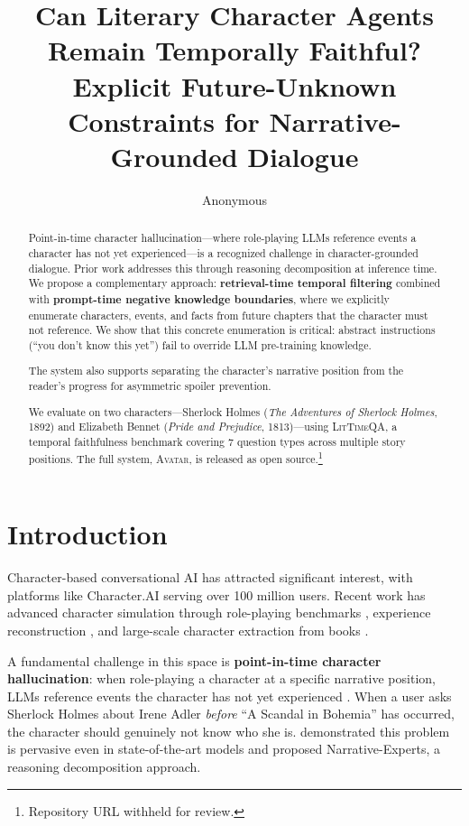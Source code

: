 \documentclass[11pt,a4paper]{article}
\title{Can Literary Character Agents Remain Temporally Faithful?\\Explicit Future-Unknown Constraints for Narrative-Grounded Dialogue}
\author{Anonymous}
\date{}
\begin{document}
\maketitle

\begin{abstract}
Point-in-time character hallucination---where role-playing LLMs reference events a character has not yet experienced---is a recognized challenge in character-grounded dialogue.
Prior work addresses this through reasoning decomposition at inference time.
We propose a complementary approach: \textbf{retrieval-time temporal filtering} combined with \textbf{prompt-time negative knowledge boundaries}, where we explicitly enumerate characters, events, and facts from future chapters that the character must not reference.
We show that this concrete enumeration is critical: abstract instructions (``you don't know this yet'') fail to override LLM pre-training knowledge.

The system also supports separating the character's narrative position from the reader's progress for asymmetric spoiler prevention.

We evaluate on two characters---Sherlock Holmes (\textit{The Adventures of Sherlock Holmes}, 1892) and Elizabeth Bennet (\textit{Pride and Prejudice}, 1813)---using \textsc{LitTimeQA}, a temporal faithfulness benchmark covering 7 question types across multiple story positions.
The full system, \textsc{Avatar}, is released as open source.\footnote{Repository URL withheld for review.}
\end{abstract}

\section{Introduction}
\label{sec:intro}

Character-based conversational AI has attracted significant interest, with platforms like Character.AI serving over 100 million users.
Recent work has advanced character simulation through role-playing benchmarks \citep{wang2024rolellm}, experience reconstruction \citep{shao2023character}, and large-scale character extraction from books \citep{chen2025coser}.

A fundamental challenge in this space is \textbf{point-in-time character hallucination}: when role-playing a character at a specific narrative position, LLMs reference events the character has not yet experienced \citep{ahn2024timechara}.
When a user asks Sherlock Holmes about Irene Adler \textit{before} ``A Scandal in Bohemia'' has occurred, the character should genuinely not know who she is.
\citet{ahn2024timechara} demonstrated this problem is pervasive even in state-of-the-art models and proposed Narrative-Experts, a reasoning decomposition approach.
\end{document}

